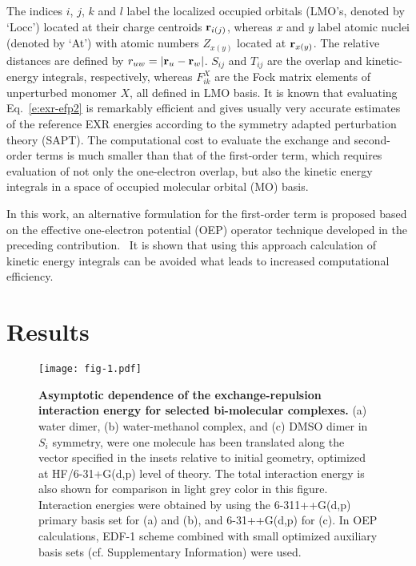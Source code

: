 %
The indices $i$, $j$, $k$ and $l$ label the localized occupied orbitals (LMO's, denoted by `Locc')
located at their charge centroids ${\bf r}_{i(j)}$,
whereas $x$ and $y$ label atomic nuclei (denoted by `At') with atomic numbers 
$Z_{x(y)}$ located at ${\bf r}_{x(y)}$. The relative distances are
defined by $r_{uw}=\vert {\bf r}_u-{\bf r}_w\vert$.
$S_{ij}$ and $T_{ij}$ are the overlap and kinetic\hyp{}energy
integrals, respectively, whereas $F_{ik}^X$ are the Fock matrix elements
of unperturbed monomer $X$, all defined in LMO basis.
It is known that evaluating Eq.~\eqref{e:exr-efp2}
is remarkably efficient and gives usually very accurate
estimates of the reference EXR energies according to the symmetry 
adapted perturbation theory\cite{Jeziorski.Moszynski.Szalewicz.ChemRev.1994} (SAPT).
The computational cost to evaluate
the exchange and second\hyp{}order terms
is much smaller than that of the first\hyp{}order term,
which requires evaluation of not only the one\hyp{}electron overlap,
but also the kinetic
energy integrals in a space of occupied molecular orbital (MO) basis.

In this work, an alternative formulation for the first\hyp{}order
term is proposed based on the effective one\hyp{}electron potential (OEP)
operator technique developed in the preceding contribution.~\cite{Blasiak.Bednarska.Choluj.Bartkowiak.JCP.2019}
It is shown that using this approach calculation of kinetic energy integrals can be avoided
what leads to increased computational efficiency.

\section{Results}

%
\begin{figure}[t]
\texttt{[image: fig-1.pdf]}
\caption{\label{f:fig-1} {\bf Asymptotic dependence of the exchange\hyp{}repulsion interaction energy
for selected bi\hyp{}molecular complexes.} 
(a) water dimer, 
(b) water\hyp{}methanol complex, and 
(c) DMSO dimer in $S_i$ symmetry,
were one molecule has been translated
along the vector specified in the insets relative to initial geometry,
optimized at HF/6-31+G(d,p) level of theory.
The 
total interaction energy
is also shown for comparison in light grey color in this figure.
Interaction energies were obtained by using the 6-311++G(d,p)
primary basis set for (a) and (b), and 6-31++G(d,p) for (c).
In OEP calculations, EDF-1 scheme combined with small optimized auxiliary basis sets
(cf. Supplementary Information) were used.
} 
\end{figure}
%

